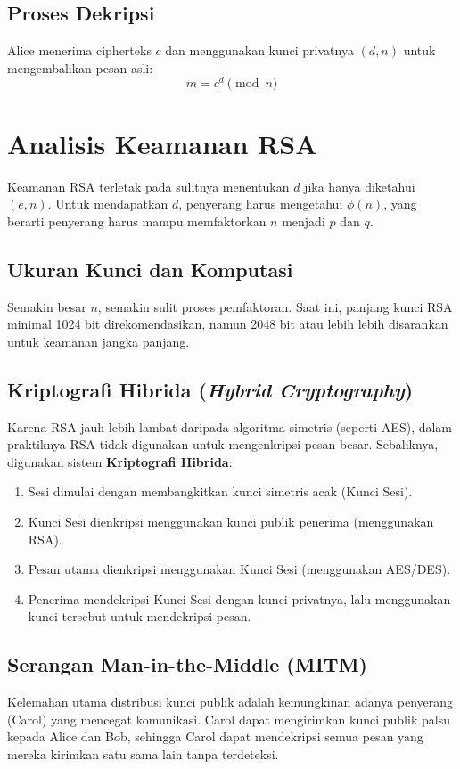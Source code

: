 \documentclass[../main.tex]{subfiles}
\begin{document}
\subsection{Proses Dekripsi}
Alice menerima cipherteks $c$ dan menggunakan kunci privatnya $(d, n)$ untuk mengembalikan pesan asli:
\[ m = c^d \pmod{n} \]

\section{Analisis Keamanan RSA}
Keamanan RSA terletak pada sulitnya menentukan $d$ jika hanya diketahui $(e, n)$. Untuk mendapatkan $d$, penyerang harus mengetahui $\phi(n)$, yang berarti penyerang harus mampu memfaktorkan $n$ menjadi $p$ dan $q$.

\subsection{Ukuran Kunci dan Komputasi}
Semakin besar $n$, semakin sulit proses pemfaktoran. Saat ini, panjang kunci RSA minimal 1024 bit direkomendasikan, namun 2048 bit atau lebih lebih disarankan untuk keamanan jangka panjang.

\subsection{Kriptografi Hibrida (\textit{Hybrid Cryptography})}
Karena RSA jauh lebih lambat daripada algoritma simetris (seperti AES), dalam praktiknya RSA tidak digunakan untuk mengenkripsi pesan besar. Sebaliknya, digunakan sistem \textbf{Kriptografi Hibrida}:
\begin{enumerate}
    \item Sesi dimulai dengan membangkitkan kunci simetris acak (Kunci Sesi).
    \item Kunci Sesi dienkripsi menggunakan kunci publik penerima (menggunakan RSA).
    \item Pesan utama dienkripsi menggunakan Kunci Sesi (menggunakan AES/DES).
    \item Penerima mendekripsi Kunci Sesi dengan kunci privatnya, lalu menggunakan kunci tersebut untuk mendekripsi pesan.
\end{enumerate}

\subsection{Serangan Man-in-the-Middle (MITM)}
Kelemahan utama distribusi kunci publik adalah kemungkinan adanya penyerang (Carol) yang mencegat komunikasi. Carol dapat mengirimkan kunci publik palsu kepada Alice dan Bob, sehingga Carol dapat mendekripsi semua pesan yang mereka kirimkan satu sama lain tanpa terdeteksi.
\end{document}
